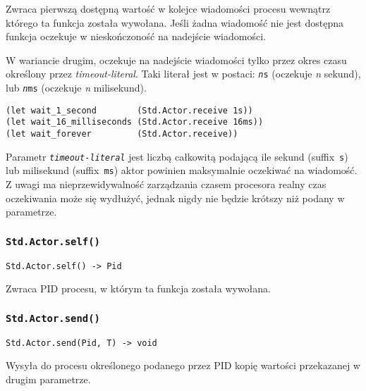 Zwraca pierwszą dostępną wartość w kolejce wiadomości procesu wewnątrz którego
ta funkcja została wywołana. Jeśli żadna wiadomość nie jest dostępna funkcja
oczekuje w nieskończoność na nadejście wiadomości.

W wariancie drugim, oczekuje na nadejście wiadomości tylko przez okres czasu
określony przez \emph{timeout-literal}. Taki literał jest w postaci:
\texttt{\emph{n}s} (oczekuje \emph{n} sekund), lub \texttt{\emph{n}ms} (oczekuje
\emph{n} milisekund).

\begin{small}
\begin{lstlisting}
(let wait_1_second        (Std.Actor.receive 1s))
(let wait_16_milliseconds (Std.Actor.receive 16ms))
(let wait_forever         (Std.Actor.receive))
\end{lstlisting}
\end{small}

Parametr \texttt{\emph{timeout-literal}} jest liczbą całkowitą podającą ile
sekund (suffix~\texttt{s}) lub milisekund (suffix~\texttt{ms}) aktor powinien
maksymalnie oczekiwać na wiadomość. Z uwagi ma nieprzewidywalność zarządzania
czasem procesora realny czas oczekiwania może się wydłużyć, jednak nigdy nie
będzie krótszy niż podany w parametrze.

\subsubsection{\texttt{Std.Actor.self()}}

\begin{small}
\begin{lstlisting}
Std.Actor.self() -> Pid
\end{lstlisting}
\end{small}

Zwraca PID procesu, w którym ta funkcja została wywołana.

\subsubsection{\texttt{Std.Actor.send()}}

\begin{small}
\begin{lstlisting}
Std.Actor.send(Pid, T) -> void
\end{lstlisting}
\end{small}

Wysyła do procesu określonego podanego przez PID kopię wartości przekazanej w
drugim parametrze.

